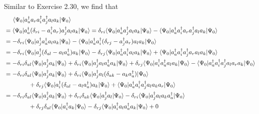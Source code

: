 \documentclass[a4paper]{book}
\newcounter{solution}[chapter]
\begin{document}
	\begin{solution}
	
	Similar to Exercise 2.30, we find that
	\begin{align*}
		&\hspace{1.4em}\langle \Psi_0 | a^\dagger_a a_r a^\dagger_i a^\dagger_j a_l a_k | \Psi_0 \rangle \\
		&= \langle \Psi_0 | a^\dagger_a ( \delta_{ri} - a^\dagger_i a_r ) a^\dagger_j a_l a_k | \Psi_0 \rangle = \delta_{ri} \langle \Psi_0 | a^\dagger_a a^\dagger_j a_l a_k | \Psi_0 \rangle - \langle \Psi_0 | a^\dagger_a a^\dagger_i a_r a^\dagger_j a_l a_k | \Psi_0 \rangle \\
		&= - \delta_{ri} \langle \Psi_0 | a^\dagger_j a^\dagger_a a_l a_k | \Psi_0 \rangle - \langle \Psi_0 | a^\dagger_a a^\dagger_i ( \delta_{rj} - a^\dagger_j a_r ) a_l a_k | \Psi_0 \rangle \\
		&= - \delta_{ri} \langle \Psi_0 | a^\dagger_j ( \delta_{al} - a_l a^\dagger_a ) a_k | \Psi_0 \rangle - \delta_{rj} \langle \Psi_0 | a^\dagger_a a^\dagger_i a_l a_k | \Psi_0 \rangle + \langle \Psi_0 | a^\dagger_a a^\dagger_i a^\dagger_j a_r a_l a_k | \Psi_0 \rangle  \\
		&= - \delta_{ri} \delta_{al} \langle \Psi_0 | a^\dagger_j a_k | \Psi_0 \rangle + \delta_{ri} \langle \Psi_0 | a^\dagger_j a_l a^\dagger_a a_k | \Psi_0 \rangle + \delta_{rj} \langle \Psi_0 | a^\dagger_i a^\dagger_a a_l a_k | \Psi_0 \rangle - \langle \Psi_0 | a^\dagger_a a^\dagger_i a^\dagger_j a_l a_r a_k | \Psi_0 \rangle \\
		&= - \delta_{ri} \delta_{al} \langle \Psi_0 | a^\dagger_j a_k | \Psi_0 \rangle + \delta_{ri} \langle \Psi_0 | a^\dagger_j a_l ( \delta_{ak} - a_k a^\dagger_a ) | \Psi_0 \rangle \\
		&\hspace{4em} + \delta_{rj} \langle \Psi_0 | a^\dagger_i ( \delta_{al} - a_l a^\dagger_a ) a_k | \Psi_0 \rangle + \langle \Psi_0 | a^\dagger_a a^\dagger_i a^\dagger_j a_l a_k a_r | \Psi_0 \rangle \\
		&= - \delta_{ri} \delta_{al} \langle \Psi_0 | a^\dagger_j a_k | \Psi_0 \rangle + \delta_{ri} \delta_{ak} \langle \Psi_0 | a^\dagger_j a_l | \Psi_0 \rangle - \delta_{ri} \langle \Psi_0 | a^\dagger_j a_l a_k a^\dagger_a | \Psi_0 \rangle \\
		&\hspace{4em} + \delta_{rj} \delta_{al} \langle \Psi_0 | a^\dagger_i a_k | \Psi_0 \rangle - \delta_{rj} \langle \Psi_0 | a^\dagger_i a_l a^\dagger_a a_k | \Psi_0 \rangle + 0 \\

\end{align*}
\end{solution}
\end{document}
